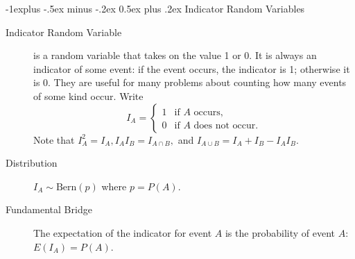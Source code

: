 \documentclass[10pt,landscape]{article}
\makeatletter
\newcommand{\Bern}{\textrm{Bern}}
\renewcommand{\subsection}{\@startsection{subsection}{2}{0mm}%
{-1explus -.5ex minus -.2ex}%
{0.5ex plus .2ex}%
{\normalfont\normalsize\bfseries}}
\makeatother
\begin{document}
\begin{multicols*}{3}
        \subsection{Indicator Random Variables}
        \begin{description}
            \item[Indicator Random Variable] is a random variable that takes on the value 1 or 0. It is always an indicator of some event: if the event occurs, the indicator is 1; otherwise it is 0. They are useful for many problems about counting how many events of some kind occur. Write \[
                                                                                                                                                                                                                                                                                                      I_A =
                                                                                                                                                                                                                                                                                                      \begin{cases}
                                                                                                                                                                                                                                                                                                          1 & \text{if $A$ occurs,}         \\
                                                                                                                                                                                                                                                                                                          0 & \text{if $A$ does not occur.}
                                                                                                                                                                                                                                                                                                      \end{cases}
            \]
            Note that $I_A^2 = I_A, I_A I_B = I_{A \cap B}, $ and $I_{A \cup B} = I_A + I_B - I_A I_B$.
            \item[Distribution] $I_A \sim \Bern(p)$ where $p = P(A)$.
            \item[Fundamental Bridge] The expectation of the indicator for event $A$ is the probability of event $A$: $E(I_A) = P(A)$.
        \end{description}


\end{multicols*}
\end{document}
